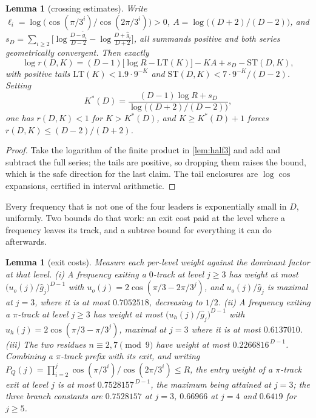 \documentclass[11pt]{amsart}
\newtheorem{lemma}[theorem]{Lemma}
\theoremstyle{definition}
\theoremstyle{remark}
\begin{document}
\begin{lemma}[crossing estimates]
\label{lem:cross3}
Write $\ell_i = \log\bigl(\cos(\pi/3^i)/\cos(2\pi/3^i)\bigr) > 0$, $A = \log\bigl((D+2)/(D-2)\bigr)$, and $s_D = \sum_{i\ge2}\bigl[\log\tfrac{D-\tilde g_i}{D-2} - \log\tfrac{D+\hat g_i}{D+2}\bigr]$, all summands positive and both series geometrically convergent. Then exactly
\[
  \log r(D,K) = (D-1)\bigl[\log R - \mathrm{LT}(K)\bigr] - KA + s_D - \mathrm{ST}(D,K),
\]
with positive tails $\mathrm{LT}(K) < 1.9\cdot 9^{-K}$ and $\mathrm{ST}(D,K) < 7\cdot 9^{-K}/(D-2)$. Setting
\[
  K^{*}(D) = \frac{(D-1)\log R + s_D}{\log\bigl((D+2)/(D-2)\bigr)},
\]
one has $r(D,K) < 1$ for $K > K^{*}(D)$, and $K \ge K^{*}(D)+1$ forces $r(D,K) \le (D-2)/(D+2)$.
\end{lemma}

\begin{proof}
Take the logarithm of the finite product in \cref{lem:half3} and add and subtract the full series; the tails are positive, so dropping them raises the bound, which is the safe direction for the last claim. The tail enclosures are $\log\cos$ expansions, certified in interval arithmetic.
\end{proof}

Every frequency that is not one of the four leaders is exponentially small in $D$, uniformly. Two bounds do that work: an exit cost paid at the level where a frequency leaves its track, and a subtree bound for everything it can do afterwards.

\begin{lemma}[exit costs]
\label{lem:exit3}
Measure each per-level weight against the dominant factor at that level. (i) A frequency exiting a $0$-track at level $j \ge 3$ has weight at most $\bigl(u_o(j)/\hat g_j\bigr)^{D-1}$ with $u_o(j) = 2\cos(\pi/3 - 2\pi/3^j)$, and $u_o(j)/\hat g_j$ is maximal at $j = 3$, where it is at most $0.7052518$, decreasing to $1/2$. (ii) A frequency exiting a $\pi$-track at level $j \ge 3$ has weight at most $\bigl(u_h(j)/\hat g_j\bigr)^{D-1}$ with $u_h(j) = 2\cos(\pi/3 - \pi/3^j)$, maximal at $j = 3$ where it is at most $0.6137010$. (iii) The two residues $n \equiv 2, 7 \pmod 9$ have weight at most $0.2266816^{\,D-1}$. Combining a $\pi$-track prefix with its exit, and writing $P_Q(j) = \prod_{i=2}^{j}\cos(\pi/3^i)/\cos(2\pi/3^i) \le R$, the entry weight of a $\pi$-track exit at level $j$ is at most $0.7528157^{\,D-1}$, the maximum being attained at $j = 3$; the three branch constants are $0.7528157$ at $j = 3$, $0.66966$ at $j = 4$ and $0.6419$ for $j \ge 5$.
\end{lemma}
\end{document}
